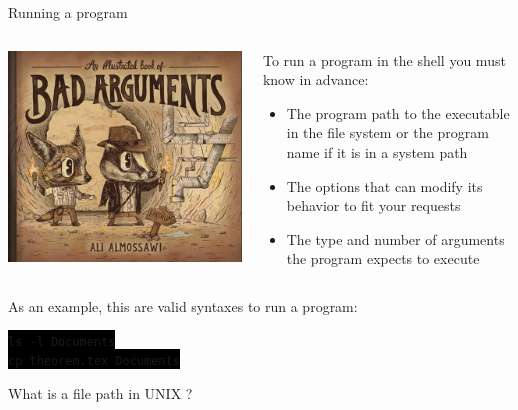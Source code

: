 \documentclass[unknownkeysallowed, 10pt, a4 paper, handout]{beamer}
\newcommand{\code}[1]{\colorbox{black}{\color{green}\texttt{#1}}}
\begin{document}
\begin{frame}[label=program]{Running a program}
  \begin{columns}[T]
    \begin{column}{.33\textwidth}
      \includegraphics[scale=0.99]{pics/bad_arguments.jpg}
    \end{column}
    \hfill
    \begin{column}{.63\textwidth}
      \small{
      To run a program in the shell you must know in advance:
      \begin{itemize}
        \item The program path to the executable in the file system or the
          program name if it is in a system path
        \item The options that can modify its behavior to fit your requests
        \item The type and number of arguments the program expects to
          execute
      \end{itemize}
    }
    \end{column}
  \end{columns}
  As an example, this are valid syntaxes to run a program:
  \begin{center}
  \code{ls -l Documents} \\
  \code{cp theorem.tex Documents}
  \end{center}
  \begin{center}
    \Large{What is a file path in UNIX ?}
  \end{center}
\end{frame}
\end{document}

